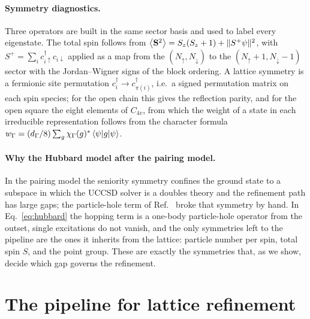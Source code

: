 \documentclass[
  aps,
  prc,
  reprint,
  superscriptaddress,
  floatfix,
  nofootinbib
]{revtex4-2}
\begin{document}
\paragraph{Symmetry diagnostics.}
Three operators are built in the same sector basis and used to label every
eigenstate.  The total spin follows from
$\expval{\mathbf S^2}=S_z(S_z+1)+\|S^+\psi\|^2$, with
$S^+=\sum_ic^\dagger_{i\uparrow}c_{i\downarrow}$ applied as a map from the
$(N_\uparrow,N_\downarrow)$ to the $(N_\uparrow+1,N_\downarrow-1)$ sector with
the Jordan--Wigner signs of the block ordering.  A lattice symmetry is a
fermionic site permutation $c^\dagger_i\to c^\dagger_{\pi(i)}$, i.e.\ a signed
permutation matrix on each spin species; for the open chain this gives the
reflection parity, and for the open square the eight elements of $C_{4v}$,
from which the weight of a state in each irreducible representation follows
from the character formula
$w_\Gamma=(d_\Gamma/8)\sum_g\chi_\Gamma(g)^*\expval{g}{\psi}$.

\paragraph{Why the Hubbard model after the pairing model.}
In the pairing model the seniority symmetry confines the ground state to a
subspace in which the UCCSD solver is a doubles theory and the refinement
path has large gaps; the particle-hole term of Ref.~\cite{PHcompanion} broke
that symmetry by hand.  In Eq.~\eqref{eq:hubbard} the hopping term is a
one-body particle-hole operator from the outset, single excitations do not
vanish, and the only symmetries left to the pipeline are the ones it inherits
from the lattice: particle number per spin, total spin $S$, and the point
group.  These are exactly the symmetries that, as we show, decide which gap
governs the refinement.

\section{The pipeline for lattice refinement}
\label{sec:pipeline}
\end{document}
